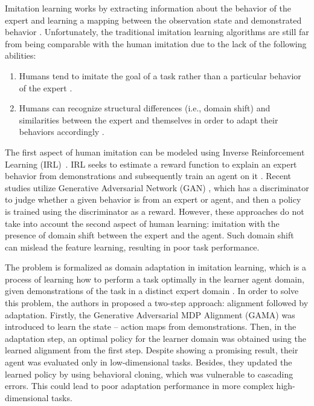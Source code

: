 Imitation learning works by extracting information about the behavior of the expert and learning a mapping between the observation state and demonstrated behavior \cite{schaal1999imitation,IL_Survey_RobotLearning}.
Unfortunately,
the traditional imitation learning algorithms are still far from being comparable with the human imitation due to the lack of the following abilities:

\begin{enumerate}
  \item
        Humans tend to imitate the goal of a task rather than a particular behavior of the expert \cite{baker2007goal,bao2017imitation}.
  \item
        Humans can recognize structural differences (i.e., domain shift) and similarities between the expert and themselves in order to adapt their behaviors accordingly \cite{tomov2021multi}.
\end{enumerate}

The first aspect of human imitation can be modeled using Inverse Reinforcement Learning (IRL)~\cite{ng2000algorithms, abbeel2004apprenticeship}.
IRL seeks to estimate a reward function to explain an expert behavior from demonstrations and subsequently train an agent on it \cite{ng2000algorithms,abbeel2004apprenticeship,levine2011nonlinear,ziebart2008maximum}.
Recent studies \cite{IL_Model_GAIL,DAIL_Model_DAIL,pmlr-v70-baram17a,behbahani2019learning,10.5555/3294996.3295138,zhang2020cgail,chi2020collaborative,zhou2020modeling} utilize Generative Adversarial Network (GAN) \cite{GAN_Original}, which has a discriminator to judge whether a given behavior is from an expert or agent, and then a policy is trained using the discriminator as a reward.
However, these approaches do not take into account the second aspect of human learning: imitation with the presence of domain shift between the expert and the agent.
Such domain shift can mislead the feature learning, resulting in poor task performance.


The problem is formalized as domain adaptation in imitation learning,
which is a process of learning how to perform a task optimally in the learner agent domain,
given demonstrations of the task in a distinct expert domain
\cite{DAIL_Model_DAIL}.
In order to solve this problem,
the authors in
\cite{DAIL_Model_DAIL} proposed a two-step approach:
alignment followed by adaptation.
Firstly,
the Generative Adversarial MDP Alignment (GAMA) was introduced to learn the state -- action maps from demonstrations.
Then,
in the adaptation step, an optimal policy for the learner domain was obtained using the learned alignment from the first step.
Despite showing a promising result,
their agent was evaluated only in low-dimensional tasks.
Besides,
they updated the learned policy by using behavioral cloning, which was vulnerable to cascading errors.
This could lead to poor adaptation performance in more complex high-dimensional tasks.

